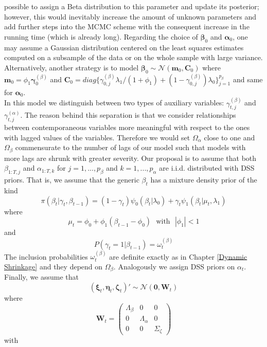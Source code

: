 \documentclass[
  12pt,
]{book}
\theoremstyle{break}
\theoremstyle{nonumberplain}
\begin{document}
possible to assign a Beta distribution to this parameter and update its
posterior; however, this would inevitably increase the amount of unknown
parameters and add further steps into the MCMC scheme with the
consequent increase in the running time (which is already long).
Regarding the choice of \(\boldsymbol{\beta}_{0}\) and
\(\boldsymbol{\alpha}_{0}\), one may assume a Gaussian distribution
centered on the least squares estimates computed on a subsample of the
data or on the whole sample with large variance. Alternatively, another
strategy is to model
\(\boldsymbol{\beta}_{0}\sim\mathcal{N}(\boldsymbol{m}_0,\boldsymbol{C}_0)\)
where \(\boldsymbol{m}_0=\phi_1\boldsymbol{\gamma}_{0}^{(\beta)}\) and
\(\boldsymbol{C}_0=diag\{\gamma_{0,j}^{(\beta)}\lambda_1/(1+\phi_1)+(1-\gamma_{0,j}^{(\beta)})\lambda_0\}_{j=1}^{p_\beta}\)
and same for \(\boldsymbol{\alpha}_0\).\\
In this model we distinguish between two types of auxiliary variables:
\(\gamma_{t,j}^{(\beta)}\) and \(\gamma_{t,j}^{(\alpha)}\). The reason
behind this separation is that we consider relationships between
contemporaneous variables more meaningful with respect to the ones with
lagged values of the variables. Therefore we would set
\(\Omega_{\alpha}\) close to one and \(\Omega_\beta\) commensurate to
the number of lags of our model such that models with more lags are
shrunk with greater severity. Our proposal is to assume that both
\(\beta_{1:T,j}\) and \(\alpha_{1:T,k}\) for \(j=1,...,p_\beta\) and
\(k=1,...,p_\alpha\) are i.i.d. distributed with DSS priors. That is, we
assume that the generic \(\beta_t\) has a mixture density prior of the
kind \begin{equation*}
\pi(\beta_{t}|\gamma_{t},\beta_{t-1})=(1-\gamma_{t})\psi_{0}(\beta_{t}|\lambda_{0})+\gamma_{t}\psi_{1}(\beta_{t}|\mu_{t},\lambda_{1})
\end{equation*} where \begin{equation*}
\mu_{t}=\phi_{0}+\phi_{1}(\beta_{t-1}-\phi_{0}) \ \ \ \text{with} \ \ \ |\phi_{1}|<1
\end{equation*} and \begin{equation*}
P(\gamma_{t}=1|\beta_{t-1})=\omega_{t}^{(\beta)}
\end{equation*} The inclusion probabilities \(\omega_{t}^{(\beta)}\) are
definite exactly as in Chapter \ref{Dynamic Shrinkage} and they depend
on \(\Omega_\beta\). Analogously we assign DSS priors on \(\alpha_t\).
Finally, we assume that \[ 
( \boldsymbol{\xi}_{t}, \boldsymbol{\eta}_{t}, \boldsymbol{\zeta}_{t})' \sim \mathcal{N}(\boldsymbol{0},\boldsymbol{W}_{t})
\] where \[ \boldsymbol{W}_{t} = \begin{pmatrix}
  \Lambda_{\beta} & 0 &  0 \\
  0 & \Lambda_{\alpha} & 0 \\
  0 & 0 & \Sigma_{\zeta} 
  \end{pmatrix}\] with
\end{document}
